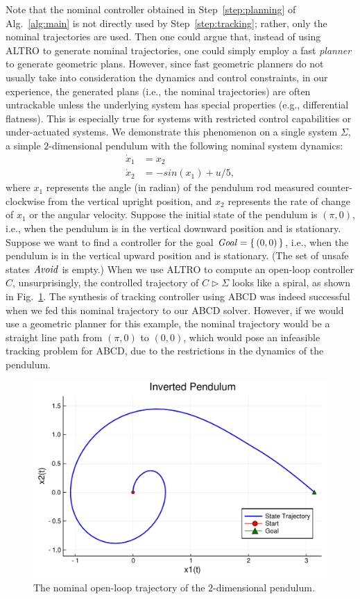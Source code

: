 Note that the nominal controller obtained in Step~\ref{step:planning} of Alg.~\ref{alg:main} is not directly used by Step~\ref{step:tracking}; 
rather, only the nominal trajectories are used.
Then one could argue that, instead of using ALTRO to generate nominal trajectories, one could simply employ a fast \emph{planner} \cite{Kavraki1996rrt} to 
generate geometric plans.
However, since fast geometric planners do not usually take into consideration the dynamics and control constraints, in our experience, the 
generated plans (i.e., the nominal trajectories) are often untrackable unless the underlying system has special properties (e.g., differential flatness).
This is especially true for systems with restricted control capabilities or under-actuated systems.
We demonstrate this phenomenon on a single system $\Sigma$, a simple $2$-dimensional pendulum with the following nominal system dynamics:
	\begin{align*}
		\dot{x}_1 &= x_2\\
		\dot{x}_2 &= -sin(x_1) + u/5,
	\end{align*}
where $x_1$ represents the angle (in radian) of the pendulum rod measured counter-clockwise from the vertical upright position, and $x_2$ represents the rate of change of $x_1$ or the angular velocity.
Suppose the initial state of the pendulum is $(\pi,0)$, i.e., when the pendulum is in the vertical downward position and is stationary.
Suppose we want to find a controller for the goal $\mathit{Goal} = \set{(0,0)}$, i.e., when the pendulum is in the vertical upward position and is stationary.
(The set of unsafe states $\mathit{Avoid}$ is empty.)
When we use ALTRO to compute an open-loop controller $C$, unsurprisingly, the controlled trajectory of $C\triangleright \Sigma$ looks like a spiral, as shown in Fig.~\ref{fig:traj 2d pendulum}.
The synthesis of tracking controller using ABCD was indeed successful when we fed this nominal trajectory to our ABCD solver.
However, if we would use a geometric planner for this example, the nominal trajectory would be a straight line path from $(\pi,0)$ to $(0,0)$, which would pose an infeasible tracking problem for ABCD, due to the restrictions in the dynamics of the pendulum.
	\begin{figure}
		\includegraphics[scale=0.2]{figures/2d_pendulum_spiral}
		\caption{The nominal open-loop trajectory of the $2$-dimensional pendulum.}
		\label{fig:traj 2d pendulum}
	\end{figure}
